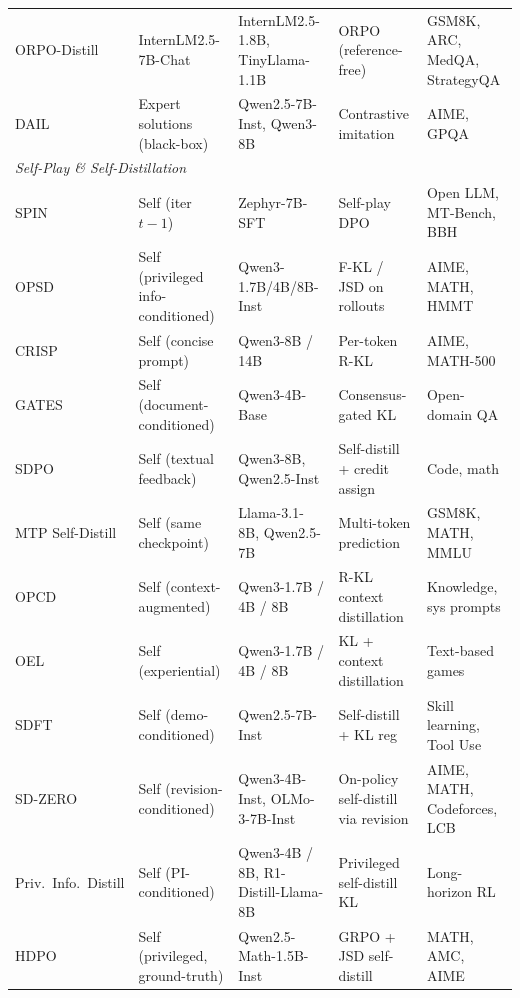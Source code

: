 \documentclass{article} %
\begin{document}
\begin{table}[t]
{\begin{tabular}{@{}lllll@{}}
        ORPO-Distill \citep{2509.25100} & InternLM2.5-7B-Chat & InternLM2.5-1.8B, TinyLlama-1.1B & ORPO (reference-free) & GSM8K, ARC, MedQA, StrategyQA \\
        DAIL \citep{2602.02405} & Expert solutions (black-box) & Qwen2.5-7B-Inst, Qwen3-8B & Contrastive imitation & AIME, GPQA \\
        \midrule
        \multicolumn{5}{l}{\textit{Self-Play \& Self-Distillation}} \\
        \midrule
        SPIN \citep{2401.01335} & Self (iter $t{-}1$) & Zephyr-7B-SFT & Self-play DPO & Open LLM, MT-Bench, BBH \\
        OPSD \citep{2601.18734} & Self (privileged info-conditioned) & Qwen3-1.7B/4B/8B-Inst & F-KL / JSD on rollouts & AIME, MATH, HMMT \\
        CRISP \citep{2603.05433} & Self (concise prompt) & Qwen3-8B / 14B & Per-token R-KL & AIME, MATH-500 \\
        GATES \citep{2602.20574} & Self (document-conditioned) & Qwen3-4B-Base & Consensus-gated KL & Open-domain QA \\
        SDPO \citep{2601.20802} & Self (textual feedback) & Qwen3-8B, Qwen2.5-Inst & Self-distill + credit assign & Code, math \\
        MTP Self-Distill \citep{2602.06019} & Self (same checkpoint) & Llama-3.1-8B, Qwen2.5-7B & Multi-token prediction & GSM8K, MATH, MMLU \\
        OPCD \citep{2602.12275} & Self (context-augmented) & Qwen3-1.7B / 4B / 8B & R-KL context distillation & Knowledge, sys prompts \\
        OEL \citep{2603.16856} & Self (experiential) & Qwen3-1.7B / 4B / 8B & KL + context distillation & Text-based games \\
        SDFT \citep{2601.19897} & Self (demo-conditioned) & Qwen2.5-7B-Inst & Self-distill + KL reg & Skill learning, Tool Use \\
        SD-ZERO \citep{he2026selfdistillation} & Self (revision-conditioned) & Qwen3-4B-Inst, OLMo-3-7B-Inst & On-policy self-distill via revision & AIME, MATH, Codeforces, LCB \\
        Priv.\ Info.\ Distill \citep{2602.04942} & Self (PI-conditioned) & Qwen3-4B / 8B, R1-Distill-Llama-8B & Privileged self-distill KL & Long-horizon RL \\
        HDPO \citep{2603.23871} & Self (privileged, ground-truth) & Qwen2.5-Math-1.5B-Inst & GRPO + JSD self-distill & MATH, AMC, AIME \\

\end{tabular}}
\end{table}
\end{document}
